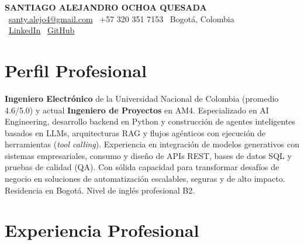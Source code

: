 \documentclass[11pt,a4paper]{article}
\begin{document}
\thispagestyle{empty}
\color{darktext}

\begin{center}
    {\Huge \bfseries\color{accent} SANTIAGO ALEJANDRO OCHOA QUESADA} \\[6pt]
    {\small\color{darktext}
    \faEnvelope\ \href{mailto:santy.alejo4@gmail.com}{santy.alejo4@gmail.com}
    \quad\textcolor{bulletline}{\textbar}\quad
    \faPhone\ +57 320 351 7153
    \quad\textcolor{bulletline}{\textbar}\quad
    \faMapMarker*\ Bogotá, Colombia \\[4pt]
    \faLinkedin\ \href{https://linkedin.com/in/santiago-alejandro-ochoa-quesada-a07a18288/}{LinkedIn}
    \quad\textcolor{bulletline}{\textbar}\quad
    \faGithub\ \href{https://github.com/Sochoaq}{GitHub}
    }
\end{center}
\vspace{4pt}

\section{Perfil Profesional}
\textbf{Ingeniero Electrónico} de la Universidad Nacional de Colombia (promedio 4.6/5.0) y actual \textbf{Ingeniero de Proyectos} en AM4. Especializado en AI Engineering, desarrollo backend en Python y construcción de agentes inteligentes basados en LLMs, arquitecturas RAG y flujos agénticos con ejecución de herramientas (\textit{tool calling}). Experiencia en integración de modelos generativos con sistemas empresariales, consumo y diseño de APIs REST, bases de datos SQL y pruebas de calidad (QA). Con sólida capacidad para transformar desafíos de negocio en soluciones de automatización escalables, seguras y de alto impacto. Residencia en Bogotá. Nivel de inglés profesional B2.

\section{Experiencia Profesional}
\end{document}

